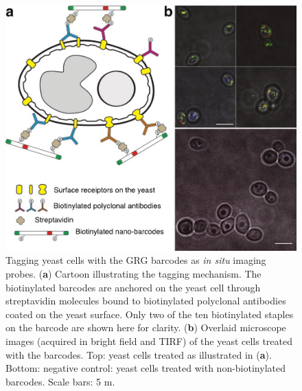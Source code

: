 \begin{figure} %
\includegraphics[width=\textwidth]{figures/dna6}
\caption[Tagging yeast cells with the GRG barcodes as \textit{in situ} imaging probes.]{Tagging yeast cells with the GRG barcodes as \textit{in situ} imaging probes. (\textbf{a}) 
Cartoon illustrating the tagging mechanism. The biotinylated barcodes are anchored on 
the yeast cell through streptavidin molecules bound to biotinylated polyclonal antibodies 
coated on the yeast surface. Only two of the ten biotinylated staples on the barcode are 
shown here for clarity. (\textbf{b}) Overlaid microscope images (acquired in bright field and 
TIRF) of the yeast cells treated with the barcodes. Top: yeast cells treated as illustrated in 
(\textbf{a}). Bottom: negative control: yeast cells treated with non-biotinylated barcodes. Scale 
bars: 5 \textmu m.
\label{fig:dna6}}
\end{figure}



